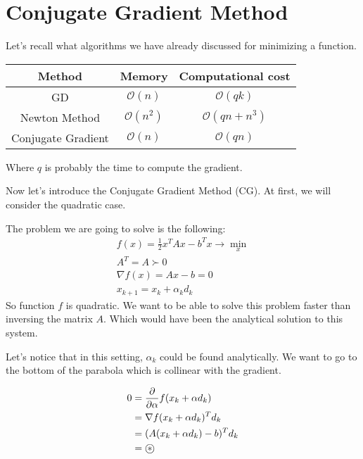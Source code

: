 \section{Conjugate Gradient Method}

Let's recall what algorithms we have already discussed for minimizing a function. 

\begin{table}[!ht]
    \centering
    \begin{tabular}{c c c}
        \toprule
        \textbf{Method} & \textbf{Memory} & \textbf{Computational cost} \\
        \midrule
        GD & $\mathcal{O}(n)$ & $\mathcal{O}(qk)$ \\
        \midrule
        Newton Method & $\mathcal{O}(n^2)$ & $\mathcal{O}(qn + n^3)$ \\
        \midrule
        Conjugate Gradient & $\mathcal{O}(n)$ & $\mathcal{O}(qn)$ \\
        \bottomrule
    \end{tabular}
\end{table}

Where $q$ is probably the time to compute the gradient.

Now let's introduce the Conjugate Gradient Method (CG). At first, we will consider the quadratic case.

The problem we are going to solve is the following:
\begin{gather*}
    f(x) = \frac{1}{2} x^T A x - b^T x \to \min_x \\ A^T = A \succ 0 \\ 
    \nabla f(x) = Ax - b = 0 \\ 
    x_{k+1} = x_k + \alpha_k d_k
\end{gather*}
So function $f$ is quadratic. We want to be able to solve this problem faster than inversing the matrix $A$. Which would have been the analytical solution to this system.

Let's notice that in this setting, $\alpha_k$ could be found analytically. We want to go to the bottom of the parabola which is collinear with the gradient.

\begin{align*}
    0 &= \frac{\partial}{\partial \alpha} f(x_k + \alpha d_k) \\ 
    &= \nabla f(x_k + \alpha d_k)^T d_k \\
    &= (A(x_k + \alpha d_k) - b)^T d_k \\
    &= \oast
\end{align*}

